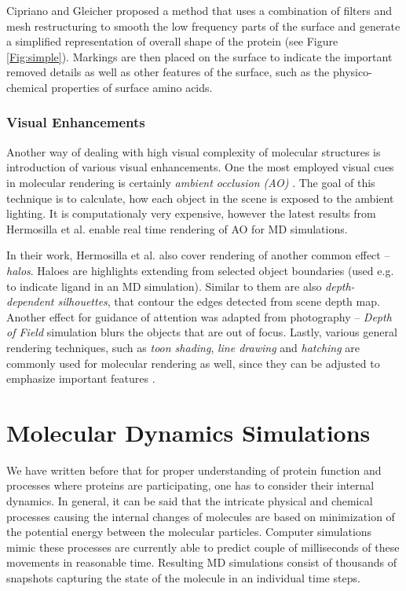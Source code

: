 Cipriano and Gleicher \cite{cipriano2007molecular} proposed a method that uses a combination of filters and mesh restructuring to smooth the low frequency parts of the surface and generate a simplified representation of overall shape of the protein (see Figure \ref{Fig:simple}). Markings are then placed on the surface to indicate the important removed details as well as other features of the surface, such as the physico-chemical properties of surface amino acids.

\vspace{-10pt}

\subsubsection{Visual Enhancements}
Another way of dealing with high visual complexity of molecular structures is introduction of various visual enhancements. One the most employed visual cues in molecular rendering is certainly \textit{ambient occlusion (AO)} \cite{miller1994efficient}. The goal of this technique is to calculate, how each object in the scene is exposed to the ambient lighting. It is computationaly very expensive, however the latest results from Hermosilla et al. \cite{hermosilla2016high} enable real time rendering of AO for MD simulations.

In their work, Hermosilla et al. also cover rendering of another common effect -- \textit{halos}. Haloes are highlights extending from selected object boundaries (used e.g. to indicate ligand in an MD simulation). Similar to them are also \textit{depth-dependent silhouettes}, that contour the edges  detected from scene depth map. Another effect for guidance of attention was adapted from photography -- \textit{Depth of Field} simulation blurs the objects that are out of focus. 
Lastly, various general rendering techniques, such as \textit{toon shading}, \textit{line drawing} and \textit{hatching} are commonly used for molecular rendering as well, since they can be adjusted to emphasize important features \cite{kozlikova2015visualization}.

\section{Molecular Dynamics Simulations}
We have written before that for proper understanding of protein function and processes where proteins are participating, one has to consider their internal dynamics. In general, it can be said that the intricate physical and chemical processes causing the internal changes of molecules are based on minimization of the potential energy between the molecular particles. Computer simulations mimic these processes are currently able to predict couple of milliseconds of these movements in reasonable time. Resulting MD simulations consist of thousands of snapshots capturing the state of the molecule in an individual time steps.

